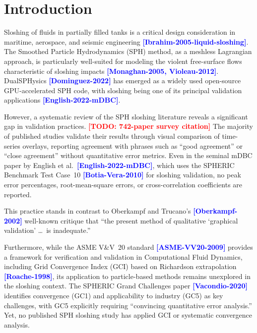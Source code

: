 \documentclass[twocolumn]{svjour3}
\newcommand{\TODO}[1]{\textcolor{red}{\textbf{[TODO: #1]}}}
\newcommand{\CITE}[1]{\textcolor{blue}{\textbf{[#1]}}}
\begin{document}
\section{Introduction}
\label{sec:intro}

Sloshing of fluids in partially filled tanks is a critical design consideration
in maritime, aerospace, and seismic engineering
\CITE{Ibrahim-2005-liquid-sloshing}.
The Smoothed Particle Hydrodynamics (SPH) method, as a meshless Lagrangian
approach, is particularly well-suited for modeling the violent free-surface
flows characteristic of sloshing impacts
\CITE{Monaghan-2005, Violeau-2012}.
DualSPHysics \CITE{Dominguez-2022} has emerged as a widely used open-source
GPU-accelerated SPH code, with sloshing being one of its principal validation
applications \CITE{English-2022-mDBC}.

However, a systematic review of the SPH sloshing literature reveals a
significant gap in validation practices.
\TODO{742-paper survey citation}
The majority of published studies validate their results through visual
comparison of time-series overlays, reporting agreement with phrases such as
``good agreement'' or ``close agreement'' without quantitative error metrics.
Even in the seminal mDBC paper by English et al.\ \CITE{English-2022-mDBC},
which uses the SPHERIC Benchmark Test Case~10 \CITE{Botia-Vera-2010} for
sloshing validation, no peak error percentages, root-mean-square errors, or
cross-correlation coefficients are reported.

This practice stands in contrast to Oberkampf and Trucano's
\CITE{Oberkampf-2002} well-known critique that ``the present method of
qualitative `graphical validation' \ldots\ is inadequate.''

Furthermore, while the ASME V\&V~20 standard \CITE{ASME-VV20-2009} provides a
framework for verification and validation in Computational Fluid Dynamics,
including Grid Convergence Index (GCI) based on Richardson extrapolation
\CITE{Roache-1998}, its application to particle-based methods remains
unexplored in the sloshing context.
The SPHERIC Grand Challenges paper \CITE{Vacondio-2020} identifies convergence
(GC1) and applicability to industry (GC5) as key challenges, with GC5
explicitly requiring ``convincing quantitative error analysis.''
Yet, no published SPH sloshing study has applied GCI or systematic convergence
analysis.
\end{document}
